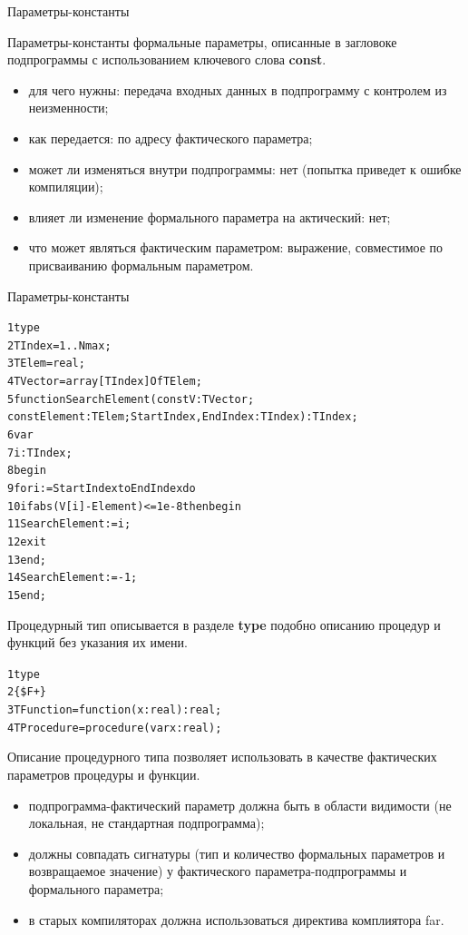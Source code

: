 \documentclass{beamer}
\begin{document}
\begin{frame}[fragile]{Параметры-константы}
\begin{block}{Параметры-константы}
формальные параметры, описанные в загловоке подпрограммы с использованием ключевого слова \textbf{const}.
\end{block}
\begin{itemize}
\item для чего нужны: передача входных данных в подпрограмму с контролем из неизменности;
\item как передается: по адресу фактического параметра;
\item может ли изменяться внутри подпрограммы: нет (попытка приведет к ошибке компиляции);
\item влияет ли изменение формального параметра на актический: нет;
\item что может являться фактическим параметром: выражение, совместимое по присваиванию формальным параметром.
\end{itemize}
\end{frame}

\begin{frame}[fragile]{Параметры-константы}
\begin{alltt}
 1 type 
 2  TIndex = 1..Nmax;
 3  TElem = real;
 4  TVector = array[TIndex] Of TElem;
 5 function SearchElement(const V:TVector; 
     const Element:TElem; StartIndex, EndIndex: TIndex):TIndex;
 6 var 
 7   i: TIndex;
 8 begin
 9 for i := StartIndex to EndIndex do
10   if abs(V[i] - Element) <= 1e-8 then begin
11     SearchElement := i;        
12     exit
13   end;	
14   SearchElement := -1;
15 end;
\end{alltt}
\end{frame}

\begin{frame}[fragile]
\begin{block}{Процедурный тип}
описывается в разделе \textbf{type} подобно описанию процедур и функций без указания их имени.
\end{block}
\begin{alltt}
 1 type 
 2  \{\$F+\}  
 3  TFunction = function(x:real):real;
 4  TProcedure = procedure(var x:real); 
\end{alltt}
Описание процедурного типа позволяет использовать в качестве фактических параметров процедуры и функции.
\begin{itemize}
\item подпрограмма-фактический параметр должна быть в области видимости (не локальная, не стандартная подпрограмма);
\item должны совпадать сигнатуры (тип и количество формальных параметров и возвращаемое значение) у фактического параметра-подпрограммы и формального параметра;
\item в старых компиляторах должна использоваться директива комплиятора far.
\end{itemize}
\end{frame}
\end{document}

